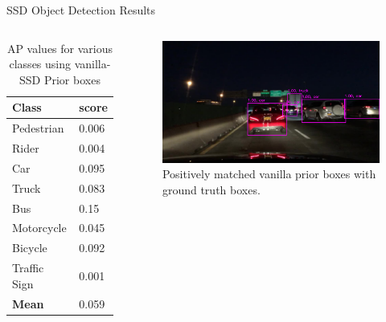 \documentclass[10pt, aspectratio=169]{beamer}
\begin{document}
\begin{frame}[allowframebreaks]{SSD Object Detection Results}

    \begin{columns}
            \begin{table}
                \caption{AP values for various classes using vanilla-SSD Prior boxes}
                \begin{tabular}{ll}
                    \hline
                        \textbf{Class} & \textbf{score} \\ \hline
                        Pedestrian     & 0.006              \\ \hline
                        Rider          & 0.004              \\ \hline
                        Car            & 0.095              \\ \hline
                        Truck          & 0.083              \\ \hline
                        Bus            & 0.15               \\ \hline 
                        Motorcycle     & 0.045              \\ \hline
                        Bicycle        & 0.092              \\ \hline
                        Traffic Sign   & 0.001              \\ \hline
                        \textbf{Mean}  & 0.059  \\\hline
                \end{tabular}
            \end{table}
            \begin{figure}[!ht]
                \centering
                \includegraphics[scale=0.175]{images/9.png}
                \caption[SSD framework]{Positively matched vanilla prior boxes with ground truth boxes.}
            \end{figure}
    \end{columns}


\end{frame}
\end{document}
